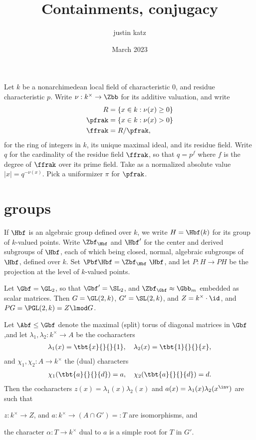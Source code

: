 \documentclass{book}
\title{Containments, conjugacy}
\author{justin katz}
\date{March 2023}
\begin{document}

% 


Let $k$ be a nonarchimedean local field of characteristic $0$, and residue characteristic $p$. Write $\nu: k^\times \to \Zbb$ for its additive valuation, and write
\begin{align*}
    R      & = \{ x \in k: \nu(x) \geq 0\} \\
    \pfrak & = \{ x \in k: \nu(x) > 0\}    \\
    \ffrak & = R/\pfrak,
\end{align*}
for the ring of integers in $k$, its unique maximal ideal, and its residue field. Write $q$ for the cardinality of the residue field $\ffrak$, so that $q=p^f$ where $f$ is the degree of $\ffrak$ over its prime field. Take as a normalized absolute value $|x| = q^{-{\nu(x)}}$. Pick a uniformizer $\pi$ for $\pfrak$.

\section*{groups}

If $\Hbf$ is an algebraic group defined over $k$, we write $H=\Hbf(k)$ for its group of $k$-valued points. Write $\Zbf_\Hbf$ and $\Hbf'$ for the center and derived subgroups of $\Hbf$, each of which being closed, normal, algebraic subgroups of $\Hbf$, defined over $k$. Set $\Pbf \Hbf = \Zbf_\Hbf \ \Hbf$, and let $P: H \to PH$ be the projection at the level of $k$-valued points.

Let $\Gbf = \GL_2$, so that $\Gbf'=\SL_2$, and $\Zbf_\Gbf \approx \Gbb_m$ embedded as scalar matrices. Then $G=\GL(2,k)$, $G'=\SL(2,k)$, and $Z = k^\times \cdot \id$, and $PG = \PGL(2,k)= Z\lmod G$.

Let $\Abf \leq \Gbf$ denote the maximal (split) torus of diagonal matrices in $\Gbf$,and let $\lambda_1,\lambda_2 : k^\times \to A$ be the cocharacters
\begin{align*}
    \lambda_1(x)=\tbt{x}{}{}{1},\quad \lambda_2(x) = \tbt{1}{}{}{x},
\end{align*}
and $\chi_1,\chi_2 : A \to k^\times$ the (dual) characters
\begin{align*}
    \chi_1(\tbt{a}{}{}{d})=a,\quad \chi_2(\tbt{a}{}{}{d})=d.
\end{align*}
Then the cocharacters $z(x) = \lambda_1(x)\lambda_2(x)$ and $a(x) = \lambda_1(x)\lambda_2(x^\inv)$ are such that \begin{enumerate*}
    \item  $z: k^\times \to Z$, and $a:k^\times \to (A\cap G') =: T $ are isomorphisms, and
    \item the character $\alpha : T \to k^\times$ dual to $a$ is a simple root for $T$ in $G'$.
\end{enumerate*}
\end{document}
